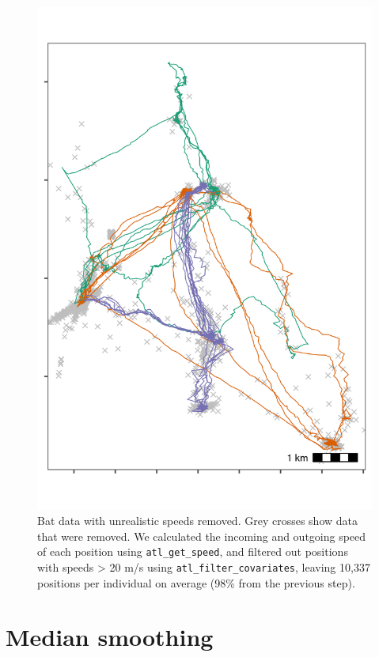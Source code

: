 \documentclass[]{scrreprt}
\begin{document}
\begin{figure}
\centering
\includegraphics{figures/fig_bat_filter_speed.png}
\caption{Bat data with unrealistic speeds removed. Grey crosses show data that were removed. We calculated the incoming and outgoing speed of each position using \texttt{atl\_get\_speed}, and filtered out positions with speeds \textgreater{} 20 m/s using \texttt{atl\_filter\_covariates}, leaving 10,337 positions per individual on average (98\% from the previous step).}
\end{figure}

\hypertarget{median-smoothing}{%
\section{Median smoothing}\label{median-smoothing}}
\end{document}
